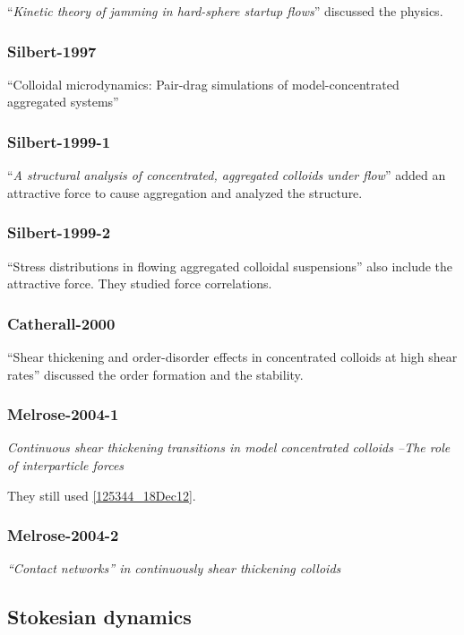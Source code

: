 \documentclass[12pt]{article}
\begin{document}
\citet{Farr_1997} 
``\emph{Kinetic theory of jamming in hard-sphere startup flows}''
discussed the physics.

\subsubsection*{Silbert-1997}
\citet{Silbert_1997}
``Colloidal microdynamics: Pair-drag simulations of model-concentrated aggregated systems''


\subsubsection*{Silbert-1999-1}
\citet{Silbert_1999}
``\emph{A structural analysis of concentrated, aggregated colloids under flow}''
added an attractive force to cause 
aggregation and analyzed the structure.

\subsubsection*{Silbert-1999-2}
\citet{Silbert_1999a}
``Stress distributions in flowing aggregated colloidal suspensions''
also include the attractive force.
%
They studied force correlations.

\subsubsection*{Catherall-2000}

\citet{Catherall_2000}
``Shear thickening and order-disorder effects in concentrated colloids at high shear rates''
discussed the order formation and the stability.

\subsubsection*{Melrose-2004-1}

\citet{Melrose_2004a}
\emph{Continuous shear thickening transitions in model concentrated colloids
--The role of interparticle forces}

They still used \eqref{125344_18Dec12}.

\subsubsection*{Melrose-2004-2}

\citet{Melrose_2004}
\emph{``Contact networks'' in continuously shear thickening colloids}

\subsection*{Stokesian dynamics}
\end{document}

